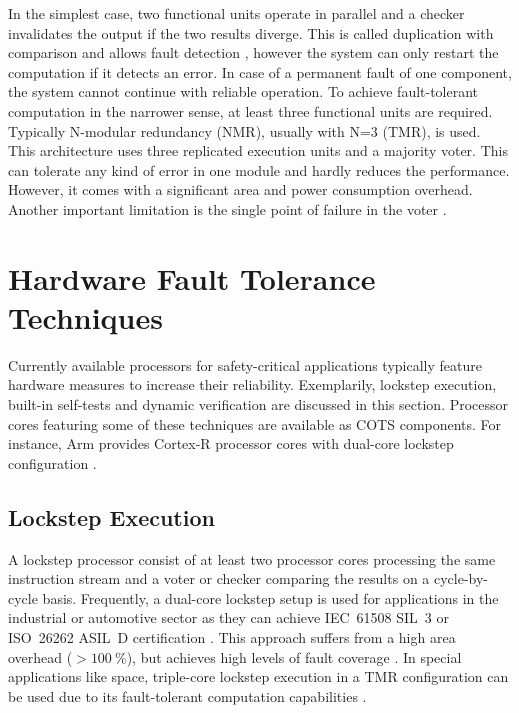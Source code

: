 \documentclass[conference]{IEEEtran}
\begin{document}
In the simplest case, two functional units operate in parallel and a checker invalidates the output if the two results diverge. This is called duplication with comparison and allows fault detection \cite{Gizopoulos2011}, however the system can only restart the computation if it detects an error. In case of a permanent fault of one component, the system cannot continue with reliable operation. To achieve fault-tolerant computation in the narrower sense, at least three functional units are required. Typically N-modular redundancy (NMR),  usually with N=3 (TMR),  is used. This architecture uses three replicated execution units and a majority voter. This can tolerate any kind of error in one module and hardly reduces the performance. However, it comes with a significant area and power consumption overhead. Another important limitation is the single point of failure in the voter \cite{Sorin2009}.


\section{Hardware Fault Tolerance Techniques}
\label{sec:hardware}

Currently available processors for safety-critical applications typically feature hardware measures to increase their reliability. Exemplarily, lockstep execution, built-in self-tests and dynamic verification are discussed in this section. Processor cores featuring some of these techniques are available as COTS components. For instance, Arm provides Cortex-R processor cores with dual-core lockstep configuration \cite{Iturbe2019}.


\subsection{Lockstep Execution}

A lockstep processor consist of at least two processor cores processing the same instruction stream and a voter or checker comparing the results on a cycle-by-cycle basis. Frequently, a dual-core lockstep setup is used for applications in the industrial or automotive sector as they can achieve IEC~61508 SIL~3 or ISO~26262 ASIL~D certification \cite{Iturbe2019,Han2017}. This approach suffers from a high area overhead ($> \SI{100}{\percent}$), but achieves high levels of fault coverage \cite{Gizopoulos2011}. In special applications like space, triple-core lockstep execution in a TMR configuration can be used due to its fault-tolerant computation capabilities \cite{Iturbe2019}.
\end{document}
